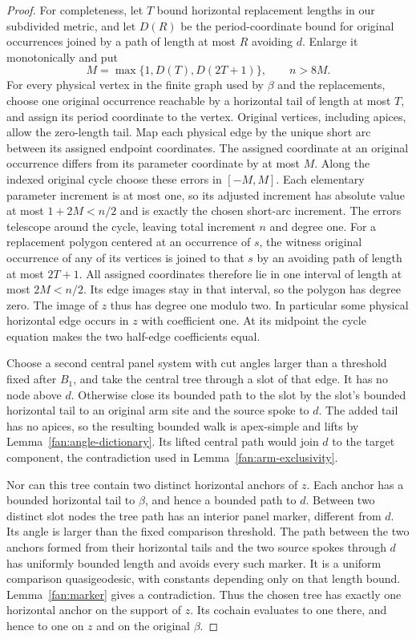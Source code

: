 \begin{proof}
For completeness, let $T$ bound horizontal replacement lengths in
our subdivided metric, and let $D(R)$ be the period-coordinate bound
for original occurrences joined by a path of length at most $R$
avoiding $d$.  Enlarge it monotonically and put
\[
 M=\max\{1,D(T),D(2T+1)\},\qquad n>8M.
\]
For every physical vertex in the finite graph used by $\beta$ and
the replacements, choose one original occurrence reachable by a
horizontal tail of length at most $T$, and assign its period
coordinate to the vertex.  Original vertices, including apices,
allow the zero-length tail.  Map each physical edge by the unique
short arc between its assigned endpoint coordinates.  The assigned
coordinate at an original occurrence differs from its parameter
coordinate by at most $M$.  Along the indexed original cycle choose
these errors in $[-M,M]$.  Each elementary parameter increment is
at most one, so its adjusted increment has absolute value at most
$1+2M<n/2$ and is exactly the chosen short-arc increment.  The errors
telescope around the cycle, leaving total increment $n$ and degree
one.  For a replacement polygon centered at an occurrence of $s$,
the witness original occurrence of any of its vertices is joined
to that $s$ by an avoiding path of length at most $2T+1$.
All assigned coordinates therefore lie in one interval of length
at most $2M<n/2$.  Its edge images stay in that interval, so the
polygon has degree zero.  The image of
$z$ thus has degree one modulo two.  In particular some physical
horizontal edge occurs in $z$ with coefficient one.  At its midpoint
the cycle equation makes the two half-edge coefficients equal.

Choose a second central panel system with cut angles larger than a
threshold fixed after $B_1$, and take the central tree through a slot
of that edge.  It has no node above $d$.  Otherwise close its bounded
path to the slot by the slot's bounded horizontal tail to an original
arm site and the source spoke to $d$.  The added tail has no apices,
so the resulting bounded walk is apex-simple and lifts by
Lemma~\ref{fan:angle-dictionary}.  Its lifted central path would join
$d$ to the target component, the contradiction used in
Lemma~\ref{fan:arm-exclusivity}.

Nor can this tree contain two distinct horizontal anchors of $z$.
Each anchor has a bounded horizontal tail to $\beta$, and hence a
bounded path to $d$.  Between two distinct slot nodes the tree path
has an interior panel marker, different from $d$.  Its angle is larger
than the fixed comparison threshold.  The path between the two
anchors formed from their horizontal tails and the two source spokes
through $d$ has uniformly bounded length and avoids every such marker.
It is a uniform comparison quasigeodesic, with constants depending
only on that length bound.  Lemma~\ref{fan:marker} gives a
contradiction.  Thus the chosen tree has exactly one horizontal anchor
on the support of $z$.  Its cochain evaluates to one there, and hence
to one on $z$ and on the original $\beta$.


\end{proof}
